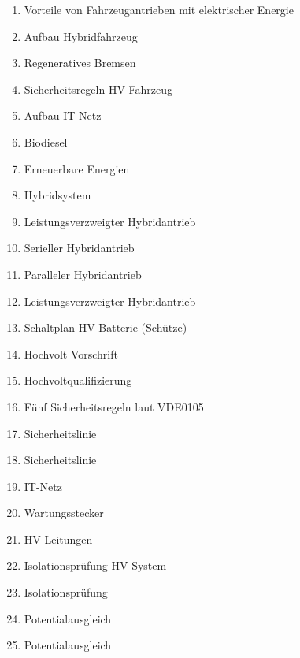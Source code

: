 \begin{enumerate}
\item
  Vorteile von Fahrzeugantrieben mit elektrischer Energie\\
\item
  Aufbau Hybridfahrzeug\\
\item
  Regeneratives Bremsen\\
\item
  Sicherheitsregeln HV-Fahrzeug\\
\item
  Aufbau IT-Netz\\
\item
  Biodiesel\\
\item
  Erneuerbare Energien\\
\item
  Hybridsystem\\
\item
  Leistungsverzweigter Hybridantrieb\\
\item
  Serieller Hybridantrieb\\
\item
  Paralleler Hybridantrieb\\
\item
  Leistungsverzweigter Hybridantrieb\\
\item
  Schaltplan HV-Batterie (Schütze)\\
\item
  Hochvolt Vorschrift\\
\item
  Hochvoltqualifizierung\\
\item
  Fünf Sicherheitsregeln laut VDE0105\\
\item
  Sicherheitslinie\\
\item
  Sicherheitslinie\\
\item
  IT-Netz\\
\item
  Wartungsstecker\\
\item
  HV-Leitungen\\
\item
  Isolationsprüfung HV-System\\
\item
  Isolationsprüfung\\
\item
  Potentialausgleich\\
\item
  Potentialausgleich
\end{enumerate}

